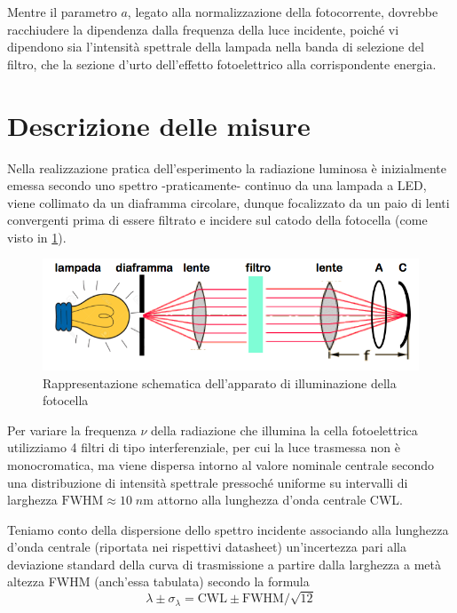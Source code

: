 \documentclass[10pt, a4paper, italian]{article}
\begin{document}
Mentre il parametro $a$, legato alla normalizzazione della fotocorrente,
dovrebbe racchiudere la dipendenza dalla frequenza della luce incidente, poiché
vi dipendono sia l'intensità spettrale della lampada nella banda di selezione
del filtro, che la sezione d'urto dell'effetto fotoelettrico alla
corrispondente energia.

\section{Descrizione delle misure}
Nella realizzazione pratica dell'esperimento la radiazione luminosa è
inizialmente emessa secondo uno spettro -praticamente- continuo da una
lampada a LED, viene collimato da un diaframma circolare, dunque focalizzato
da un paio di lenti convergenti prima di essere filtrato e incidere sul catodo
della fotocella (come visto in \cref{fig: lamp}).
\begin{figure}[htbp]
    \centering
	\includegraphics[scale=0.7]{lamp}
    \caption{Rappresentazione schematica dell'apparato di illuminazione della
    fotocella
    \label{fig: lamp}}
\end{figure}

Per variare la frequenza $\nu$ della radiazione che illumina la cella
fotoelettrica utilizziamo 4 filtri di tipo interferenziale, per cui la luce
trasmessa non è monocromatica, ma viene dispersa intorno al valore nominale
centrale secondo una distribuzione di intensità spettrale pressoché uniforme
su intervalli di larghezza $\text{FWHM} \approx 10 \; \si{n\m}$ attorno alla
lunghezza d'onda centrale CWL.

Teniamo conto della dispersione dello spettro incidente associando alla
lunghezza d'onda centrale (riportata nei rispettivi datasheet) un'incertezza
pari alla deviazione standard della curva di trasmissione a partire dalla
larghezza a metà altezza FWHM (anch'essa tabulata) secondo la formula
\[
\lambda \pm \sigma_\lambda = \text{CWL} \pm \text{FWHM}/\sqrt{12}
\]
\end{document}
